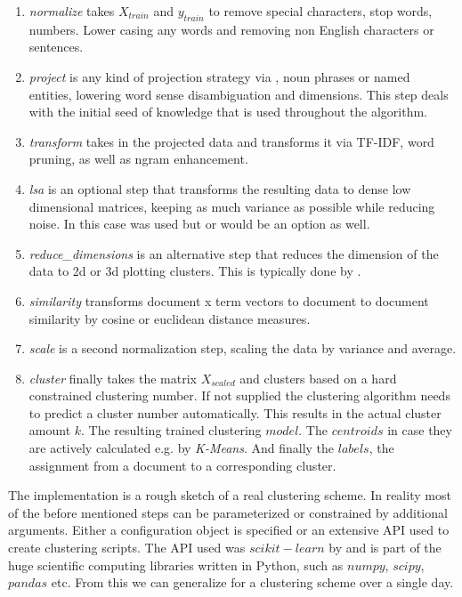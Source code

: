   \begin{enumerate}
    \item \emph{normalize} takes $X_{train}$ and $y_{train}$ to remove special characters, stop words, numbers. Lower casing any words and removing non English characters or sentences. 
    \item \emph{project} is any kind of projection strategy via \wordnet{}, noun phrases or named entities, lowering word sense disambiguation and dimensions. This step deals with the initial seed of knowledge that is used throughout the algorithm.
    \item \emph{transform} takes in the projected data and transforms it via TF-IDF, word pruning, as well as ngram enhancement.
    \item \emph{lsa} is an optional step that transforms the resulting data to dense low dimensional matrices, keeping as much variance as possible while reducing noise. In this case \lsa{} was used but \lda{} or \hdp{} would be an option as well. 
    \item \emph{reduce\_dimensions} is an alternative step that reduces the dimension of the data to 2d or 3d plotting clusters. This is typically done by \pca{}.
    \item \emph{similarity} transforms document x term vectors to document to document similarity by cosine or euclidean distance measures.
    \item \emph{scale} is a second normalization step, scaling the data by variance and average.
    \item \emph{cluster} finally takes the matrix $X_{scaled}$ and clusters based on a hard constrained clustering number. If not supplied the clustering algorithm needs to predict a cluster number automatically. This results in the actual cluster amount $k$. The resulting trained clustering $model$. The $centroids$ in case they are actively calculated e.g. by \emph{K-Means}. And finally the $labels$, the assignment from a document to a corresponding cluster.
  \end{enumerate}

The implementation is a rough sketch of a real clustering scheme. In reality most of the before mentioned steps can be parameterized or constrained by additional arguments. Either a configuration object is specified or an extensive API used to create clustering scripts. The API used was $scikit-learn$ by \cite{ScikitLearn} and is part of the huge scientific computing libraries written in Python, such as $numpy$, $scipy$, $pandas$ etc. From this we can generalize for a clustering scheme over a single day.

